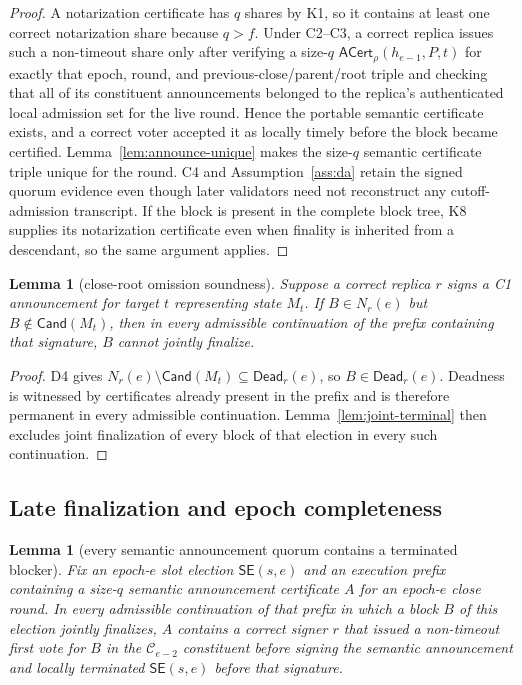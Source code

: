 \documentclass[11pt]{article}
\newtheorem{lemma}[theorem]{Lemma}
\theoremstyle{definition}
\theoremstyle{remark}
\newcommand{\C}{\mathcal C}
\newcommand{\SE}{\mathsf{SE}}
\newcommand{\Cand}{\mathsf{Cand}}
\newcommand{\ACert}{\mathsf{ACert}}
\newcommand{\Dead}{\mathsf{Dead}}
\begin{document}
\begin{proof}
A notarization certificate has $q$ shares by K1, so it contains at least one correct notarization share because $q>f$. Under C2--C3, a correct replica issues such a non-timeout share only after verifying a size-$q$ $\ACert_\rho(h_{e-1},P,t)$ for exactly that epoch, round, and previous-close/parent/root triple and checking that all of its constituent announcements belonged to the replica's authenticated local admission set for the live round. Hence the portable semantic certificate exists, and a correct voter accepted it as locally timely before the block became certified. Lemma~\ref{lem:announce-unique} makes the size-$q$ semantic certificate triple unique for the round. C4 and Assumption~\ref{ass:da} retain the signed quorum evidence even though later validators need not reconstruct any cutoff-admission transcript. If the block is present in the complete block tree, K8 supplies its notarization certificate even when finality is inherited from a descendant, so the same argument applies.
\end{proof}

\begin{lemma}[close-root omission soundness]
\label{lem:close-root}
Suppose a correct replica $r$ signs a C1 announcement for target $t$ representing state $M_t$. If $B\in N_r(e)$ but $B\notin\Cand(M_t)$, then in every admissible continuation of the prefix containing that signature, $B$ cannot jointly finalize.
\end{lemma}

\begin{proof}
D4 gives $N_r(e)\setminus\Cand(M_t)\subseteq\Dead_r(e)$, so $B\in\Dead_r(e)$. Deadness is witnessed by certificates already present in the prefix and is therefore permanent in every admissible continuation. Lemma~\ref{lem:joint-terminal} then excludes joint finalization of every block of that election in every such continuation.
\end{proof}

\subsection{Late finalization and epoch completeness}

\begin{lemma}[every semantic announcement quorum contains a terminated blocker]
\label{lem:block-close}
Fix an epoch-$e$ slot election $\SE(s,e)$ and an execution prefix containing a size-$q$ semantic announcement certificate $A$ for an epoch-$e$ close round. In every admissible continuation of that prefix in which a block $B$ of this election jointly finalizes, $A$ contains a correct signer $r$ that issued a non-timeout first vote for $B$ in the $\C_{e-2}$ constituent before signing the semantic announcement and locally terminated $\SE(s,e)$ before that signature.
\end{lemma}
\end{document}
